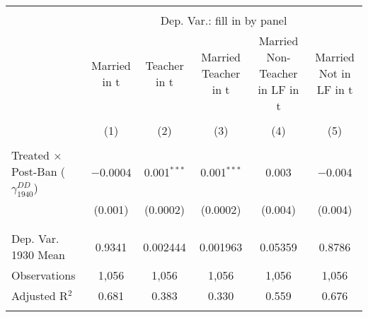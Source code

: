 
\begin{tabular}{@{\extracolsep{5pt}}lccccc} 
\\[-1.8ex]\hline 
\hline \\[-1.8ex] 
 & \multicolumn{5}{c}{Dep. Var.: fill in by panel} \\ 
\cline{2-6} 
 & Married in t & Teacher in t & Married Teacher in t & Married Non-Teacher in LF in t & Married Not in LF in t \\ 
\\[-1.8ex] & (1) & (2) & (3) & (4) & (5)\\ 
\hline \\[-1.8ex] 
 Treated $\times$ Post-Ban ($\gamma_{1940}^{DD}$) & $-$0.0004 & 0.001$^{***}$ & 0.001$^{***}$ & 0.003 & $-$0.004 \\ 
  & (0.001) & (0.0002) & (0.0002) & (0.004) & (0.004) \\ 
  & & & & & \\ 
\hline \\[-1.8ex] 
Dep. Var. 1930 Mean & 0.9341 & 0.002444 & 0.001963 & 0.05359 & 0.8786 \\ 
Observations & 1,056 & 1,056 & 1,056 & 1,056 & 1,056 \\ 
Adjusted R$^{2}$ & 0.681 & 0.383 & 0.330 & 0.559 & 0.676 \\ 
\hline 
\hline \\[-1.8ex] 
\end{tabular} 
